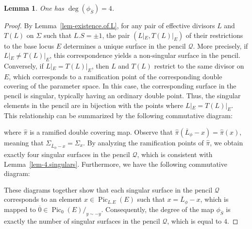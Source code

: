 \documentclass[11pt]{amsart}
\numberwithin{equation}{section}
\theoremstyle{definition}
\theoremstyle{plain}
\newtheorem{lemma}[definition]{Lemma}
\theoremstyle{remark}
\DeclareMathOperator{\Pic}{Pic}
\begin{document}
\begin{lemma}\label{lem-degree.phi(S)}
 One has $\deg (\phi_{\overline{S}})= 4$.
\end{lemma}

\begin{proof} 
  By Lemma~\ref{lem-existence.of.L}, for any pair of effective divisors $L$ and $T(L)$ on $\Sigma$ such that $L.S= \pm 1$, the pair $(L|_E, T(L)|_E)$  of their restrictions to the base locus $E$ determines a unique surface in the pencil $\mathcal{Q}$.  More precisely, if $L|_E \neq T(L)|_E$, this correspondence yields a non-singular surface in the pencil. Conversely, if $L|_E = T(L)|_E$, then $L$ and $T(L)$ restrict to the same divisor on $E$, which corresponds to a ramification point of the corresponding double covering of the parameter space. In this case, the corresponding surface in the pencil is singular, typically having an ordinary double point. Thus, the singular elements in the pencil are in bijection with the points where $L|_E = T(L)|_E$.  This relationship can be summarized by the following commutative diagram:
\begin{center}
\end{center}
where $\hat{\pi}$ is a  ramified double covering map. Observe that $\hat{\pi}(\overline{L}_{\phi}-x)=\hat{\pi}(x)$, meaning that $\Sigma_{\overline{L}_{\phi}-x}=\Sigma_x$.
By analyzing the ramification points of $\hat{\pi}$, we obtain exactly four singular surfaces in the pencil $\mathcal{Q}$, which is consistent with Lemma~\ref{lem-4.singulars}. Furthermore, we have the following commutative diagram:
\begin{center}
\end{center}

These diagrams together show that  each singular surface in the pencil $\mathcal{Q}$ corresponds to an element $x\in \Pic_{L.E}(E)$ such that $x=\overline{L}_{\phi}-x$, which is mapped to $\overline{0}\in \Pic_0(E)/_{y\sim -y}$. Consequently, the degree of the map $\phi_{\overline{S}}$  is exactly the number of singular surfaces in the pencil $\mathcal{Q}$, which is equal to $4$.
\end{proof}
\end{document}
